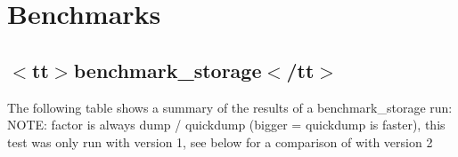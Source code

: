 \hypertarget{autotoc_md545_src_plugins_quickdump_benchmarks_md}{}\section{Benchmarks}\label{autotoc_md545_src_plugins_quickdump_benchmarks_md}
\hypertarget{autotoc_md545_autotoc_md546}{}\subsection{$<$tt$>$benchmark\+\_\+storage$<$/tt$>$}\label{autotoc_md545_autotoc_md546}
The following table shows a summary of the results of a {\ttfamily benchmark\+\_\+storage} run\+: N\+O\+TE\+: {\ttfamily factor} is always {\ttfamily dump / quickdump} (bigger = {\ttfamily quickdump} is faster), this test was only run with version 1, see below for a comparison of with version 2


